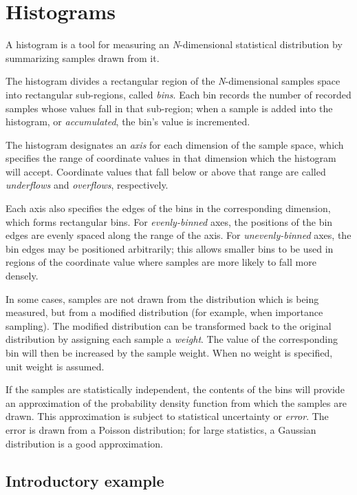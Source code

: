 \chapter{Histograms}

A histogram is a tool for measuring an \textit{N}-dimensional
statistical distribution by summarizing samples drawn from it.

The histogram divides a rectangular region of the \textit{N}-dimensional
samples space into rectangular sub-regions, called \textit{bins}.  Each
bin records the number of recorded samples whose values fall in that
sub-region; when a sample is added into the histogram, or
\textit{accumulated}, the bin's value is incremented.

The histogram designates an \textit{axis} for each dimension of the
sample space, which specifies the range of coordinate values in that
dimension which the histogram will accept.  Coordinate values that fall
below or above that range are called \textit{underflows} and
\textit{overflows}, respectively.

Each axis also specifies the edges of the bins in the corresponding
dimension, which forms rectangular bins.  For \textit{evenly-binned}
axes, the positions of the bin edges are evenly spaced along the range
of the axis.  For \textit{unevenly-binned} axes, the bin edges may be
positioned arbitrarily; this allows smaller bins to be used in regions
of the coordinate value where samples are more likely to fall more
densely.

In some cases, samples are not drawn from the distribution which is
being measured, but from a modified distribution (for example, when
importance sampling).  The modified distribution can be transformed back
to the original distribution by assigning each sample a \textit{weight}.
The value of the corresponding bin will then be increased by the sample
weight.  When no weight is specified, unit weight is assumed.

If the samples are statistically independent, the contents of the bins
will provide an approximation of the probability density function from
which the samples are drawn.  This approximation is subject to
statistical uncertainty or \textit{error}.  The error is drawn from a
Poisson distribution; for large statistics, a Gaussian distribution is a
good approximation.  


\section{Introductory example}

